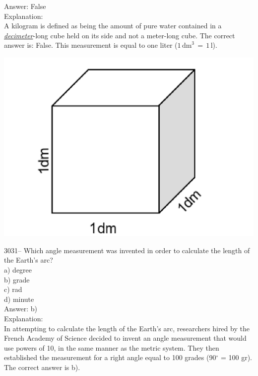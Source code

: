 \documentclass[letterpaper, 12pt]{article}
\begin{document}
Answer: False\\

Explanation:\\
A kilogram is defined as being the amount of pure water contained in a \emph{\underline{decimeter}}-long cube held on its side and not a meter-long cube. The correct answer is: False. This measurement is equal to one liter ($1\,\text{dm}^{3}\,=\,1\,\text{l}$).\\

\begin{center}
\includegraphics[scale=0.3]{cubedm.eps}
\end{center}



3031-- Which angle measurement was invented in order to calculate the length of the Earth's arc?\\

a) degree\\
b) grade\\
c) rad\\
d) minute\\

Answer: b)\\

Explanation:\\
In attempting to calculate the length of the Earth's arc, researchers hired by the French Academy of Science decided to invent an angle measurement that would use powers of 10, in the same manner as the metric system. They then established the measurement for a right angle equal to 100 grades (90$^\circ$ = 100 gr). The correct answer is b).\\
\end{document}
